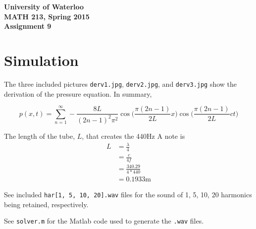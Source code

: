\documentclass[12pt]{article}
\begin{document}
\begin{center}
{\Large\bf University of Waterloo}\\
\vspace{3mm}
{\Large\bf MATH 213, Spring 2015}\\
\vspace{2mm}
{\Large\bf Assignment 9}\\
\end{center}

\section*{Simulation}

The three included pictures \texttt{derv1.jpg}, \texttt{derv2.jpg}, and \texttt{derv3.jpg} show the derivation of the pressure equation. In summary,

$$p(x, t) = \sum_{n = 1}^{\infty} - \frac{8L}{(2n - 1)^2 \pi^2}
\cos\bigg(\frac{\pi (2n - 1)}{2L} x\bigg) \cos\bigg(\frac{\pi (2n - 1)}{2L} ct\bigg)$$

\noindent The length of the tube, $L$, that creates the 440Hz A note is
\begin{align*}
    L &= \frac{\lambda}{4} \\
      &= \frac{c}{4f} \\
      &= \frac{340.29}{4 * 440} \tag{c given by Google} \\
      &= 0.1933 \text{m} \tag{approx}
\end{align*}

\noindent See included \texttt{har[1, 5, 10, 20].wav} files for the sound of 1, 5, 10, 20 harmonics being retained, respectively.

\noindent See \texttt{solver.m} for the Matlab code used to generate the \texttt{.wav} files.
\end{document}
